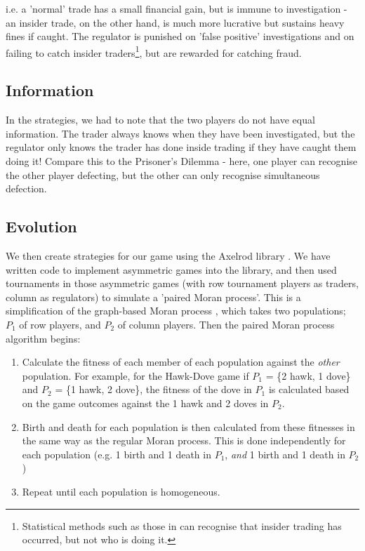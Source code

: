 \documentclass{article}
\begin{document}
i.e. a 'normal' trade has a small financial gain, but is immune to investigation - an insider trade, on the other hand, is much more lucrative but sustains heavy fines if caught. The regulator is punished on 'false positive' investigations and on failing to catch insider traders\footnote{Statistical methods such as those in \citet{bris2005insider} can recognise that insider trading has occurred, but not who is doing it.}, but are rewarded for catching fraud. 

\subsection{Information}
In the strategies, we had to note that the two players do not have equal information. The trader always knows when they have been investigated, but the regulator only knows the trader has done inside trading if they have caught them doing it! Compare this to the Prisoner's Dilemma - here, one player can recognise the other player defecting, but the other can only recognise simultaneous defection.

\subsection{Evolution}
We then create strategies for our game using the Axelrod library \citep{axelrodproject}. We have written code to implement asymmetric games into the library, and then used tournaments in those asymmetric games (with row tournament players as traders, column as regulators) to simulate a 'paired Moran process'. This is a simplification of the graph-based Moran process \citep{shakarian2013novel}, which takes two populations; $P_1$ of row players, and $P_2$ of column players. Then the paired Moran process algorithm begins:
\begin{enumerate}
\item Calculate the fitness of each member of each population against the \emph{other} population. For example, for the Hawk-Dove game if $P_1$ = \{2 hawk, 1 dove\} and $P_2$ = \{1 hawk, 2 dove\}, the fitness of the dove in $P_1$ is calculated based on the game outcomes against the 1 hawk and 2 doves in $P_2$.
\item Birth and death for each population is then calculated from these fitnesses in the same way as the regular Moran process. This is done independently for each population (e.g. 1 birth and 1 death in $P_1$, \emph{and} 1 birth and 1 death in $P_2$)
\item Repeat until each population is homogeneous.
\end{enumerate}
\end{document}
